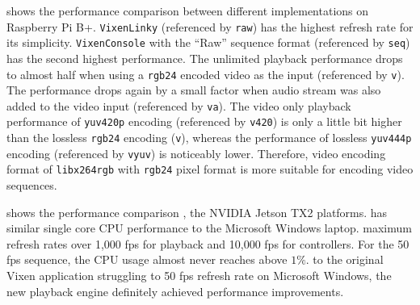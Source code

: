  shows the performance comparison between different implementations on Raspberry Pi B+. \texttt{VixenLinky} (referenced by \texttt{raw}) has the highest refresh rate for its simplicity. \texttt{VixenConsole} with the ``Raw'' sequence format (referenced by \texttt{seq}) has the second highest performance. The unlimited playback performance drops to almost half when using a \texttt{rgb24} encoded video as the input (referenced by \texttt{v}). The performance drops again by a small factor when audio stream was also added to the video input (referenced by \texttt{va}). The video only playback performance of \texttt{yuv420p} encoding (referenced by \texttt{v420}) is only a little bit higher than the lossless \texttt{rgb24} encoding (\texttt{v}), whereas the performance of lossless \texttt{yuv444p} encoding (referenced by \texttt{vyuv}) is noticeably lower. Therefore, video encoding format of \texttt{libx264rgb} with \texttt{rgb24} pixel format is more suitable for encoding video sequences.

  shows the performance comparison ,  the NVIDIA Jetson TX2 platforms.  has  similar single core CPU performance to the Microsoft Windows laptop.  maximum refresh rates  over 1,000 fps for playback and 10,000 fps for controllers. For the 50 fps  sequence, the CPU usage almost never reaches above $1 \%$.  to the original Vixen application struggling to  50 fps refresh rate on Microsoft Windows, the new playback engine definitely achieved  performance improvements.

